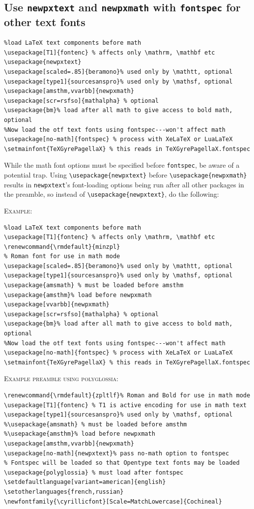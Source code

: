 \documentclass[11pt]{article}
\theoremstyle{oldplain}
\theoremstyle{plain}
\begin{document}
\subsection{Use {\tt newpxtext} and {\tt newpxmath} with {\tt fontspec} for other text fonts}
\begin{verbatim}
%load LaTeX text components before math
\usepackage[T1]{fontenc} % affects only \mathrm, \mathbf etc
\usepackage{newpxtext}
\usepackage[scaled=.85]{beramono}% used only by \mathtt, optional
\usepackage[type1]{sourcesanspro}% used only by \mathsf, optional
\usepackage[amsthm,vvarbb]{newpxmath}
\usepackage[scr=rsfso]{mathalpha} % optional
\usepackage{bm}% load after all math to give access to bold math, optional
%Now load the otf text fonts using fontspec---won't affect math
\usepackage[no-math]{fontspec} % process with XeLaTeX or LuaLaTeX
\setmainfont{TeXGyrePagellaX} % this reads in TeXGyrePagellaX.fontspec
\end{verbatim}

While the math font options must be specified before {\tt fontspec}, be aware of a potential trap. Using \verb|\usepackage{newpxtext}| before \verb|\usepackage{newpxmath}| results in {\tt newpxtext}'s font-loading options being run after all other packages in the preamble, so instead of \verb|\usepackage{newpxtext}|, do the following:

\textsc{Example:}
\begin{verbatim}
%load LaTeX text components before math
\usepackage[T1]{fontenc} % affects only \mathrm, \mathbf etc
\renewcommand{\rmdefault}{minzpl}
% Roman font for use in math mode
\usepackage[scaled=.85]{beramono}% used only by \mathtt, optional
\usepackage[type1]{sourcesanspro}% used only by \mathsf, optional
\usepackage{amsmath} % must be loaded before amsthm
\usepackage{amsthm}% load before newpxmath
\usepackage[vvarbb]{newpxmath}
\usepackage[scr=rsfso]{mathalpha} % optional
\usepackage{bm}% load after all math to give access to bold math, optional
%Now load the otf text fonts using fontspec---won't affect math
\usepackage[no-math]{fontspec} % process with XeLaTeX or LuaLaTeX
\setmainfont{TeXGyrePagellaX} % this reads in TeXGyrePagellaX.fontspec
\end{verbatim}

\textsc{Example preamble using polyglossia:}

\begin{verbatim}
\renewcommand{\rmdefault}{zpltlf}% Roman and Bold for use in math mode
\usepackage[T1]{fontenc} % T1 is active encoding for use in math text
\usepackage[type1]{sourcesanspro}% used only by \mathsf, optional
%\usepackage{amsmath} % must be loaded before amsthm
%\usepackage{amsthm}% load before newpxmath
\usepackage[amsthm,vvarbb]{newpxmath}
\usepackage[no-math]{newpxtext}% pass no-math option to fontspec
% Fontspec will be loaded so that Opentype text fonts may be loaded
\usepackage{polyglossia} % must load after fontspec
\setdefaultlanguage[variant=american]{english}
\setotherlanguages{french,russian}
\newfontfamily{\cyrillicfont}[Scale=MatchLowercase]{Cochineal}
\end{verbatim}
\fi
\end{document}
